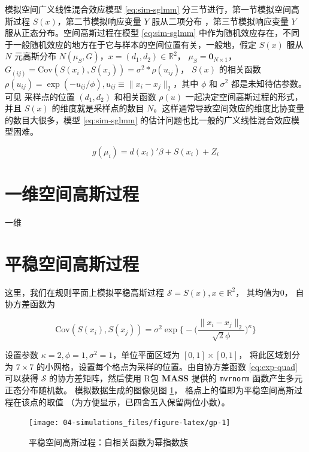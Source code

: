 \documentclass[12pt,a4paper,UTF8,twoside]{book}
\theoremstyle{definition}
\theoremstyle{definition}
\theoremstyle{definition}
\theoremstyle{remark}
\begin{document}
模拟空间广义线性混合效应模型 \eqref{eq:sim-sglmm}
分三节进行，第一节模拟空间高斯过程 \(S(x)\)，第二节模拟响应变量 \(Y\)
服从二项分布 ，第三节模拟响应变量 \(Y\) 服从正态分布。空间高斯过程在模型
\eqref{eq:sim-sglmm}
中作为随机效应存在，不同于一般随机效应的地方在于它与样本的空间位置有关，一般地，假定
\(S(x)\) 服从 \(N\) 元高斯分布
\(N(\mu_{S},G)\)，\(x = (d_1,d_2) \in \mathbb{R}^2\)，
\(\mu_{S} = \mathbf{0}_{N\times1}\)，
\(G_{(ij)} = \mathrm{Cov}(S(x_i),S(x_j))=\sigma^2*\rho(u_{ij})\)，
\(S(x)\) 的相关函数
\(\rho(u_{ij}) = \exp(-u_{ij}/\phi), u_{ij} \equiv \|x_{i}-x_{j}\|_2\)，其中
\(\phi\) 和 \(\sigma^2\) 都是未知待估参数。可见 采样点的位置
\((d_1,d_2)\) 和相关函数 \(\rho(u)\) 一起决定空间高斯过程的形式，并且
\(S(x)\) 的维度就是采样点的数目
\(N\)。这样通常导致空间效应的维度比协变量的数目大很多，模型
\eqref{eq:sim-sglmm} 的估计问题也比一般的广义线性混合效应模型困难。

\begin{equation}
g(\mu_i) = d(x_i)'\beta + S(x_i) + Z_i \label{eq:sim-sglmm}
\end{equation}

\section{一维空间高斯过程}

一维

\hypertarget{sim-gp}{%
\section{平稳空间高斯过程}\label{sim-gp}}

这里，我们在规则平面上模拟平稳高斯过程
\(\mathcal{S} = S(x), x \in \mathbb{R}^2\)， 其均值为0， 自协方差函数为

\begin{equation}
\mathrm{Cov}(S(x_i),S(x_j)) = \sigma^2\exp\big\{-\big( \frac{ \| x_{i} - x_{j} \|_{2}}{\sqrt{2}\phi}\big)^{\kappa}\big\}  \label{eq:exp-quad}
\end{equation}

\noindent 设置参数 \(\kappa = 2,\phi=1,\sigma^2=1\)，单位平面区域为
\([0,1]\times[0,1]\)， 将此区域划分为 \(7\times 7\)
的小网格，设置每个格点为采样的位置。由自协方差函数 \eqref{eq:exp-quad}
可以获得 \(\mathcal{S}\) 的协方差矩阵，然后使用 R包 \textbf{MASS} 提供的
\texttt{mvrnorm} 函数产生多元正态分布随机数。 模拟数据生成的图像见图
\ref{fig:gp}， 格点上的值即为平稳空间高斯过程在该点的取值
（为方便显示，已四舍五入保留两位小数）。

\begin{figure}

{\centering \texttt{[image: 04-simulations\_files/figure-latex/gp-1]} 

}

\caption{平稳空间高斯过程：自相关函数为幂指数族}\label{fig:gp}
\end{figure}
\end{document}
